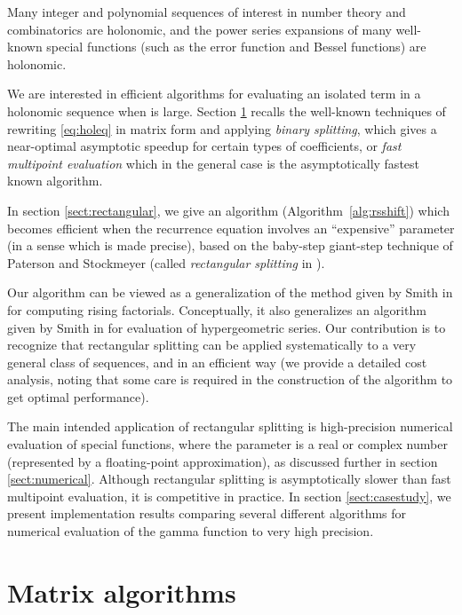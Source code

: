 \documentclass{sig-alternate}
\begin{document}
Many integer and polynomial sequences of interest in number theory and
combinatorics are holonomic, and the power series expansions of many well-known
special functions (such as the error function and Bessel functions)
are holonomic.

We are interested in efficient algorithms for evaluating an isolated term
 in a holonomic sequence when  is large.
Section \ref{sect:matrix} recalls the well-known
techniques of rewriting \eqref{eq:holeq} in matrix form and applying
\emph{binary splitting}, which gives a near-optimal asymptotic speedup
for certain types of coefficients,
or \emph{fast multipoint evaluation} which
in the general case is the asymptotically fastest known algorithm.

In section \ref{sect:rectangular}, we give an algorithm
(Algorithm~\ref{alg:rsshift}) which becomes
efficient when the recurrence equation involves an ``expensive''
parameter (in a sense which is made precise),
based on the baby-step giant-step technique
of Paterson and Stockmeyer \cite{PatersonStockmeyer1973}
(called \emph{rectangular splitting} in \cite{mca}).

Our algorithm can be viewed as a generalization of the method given by Smith in
\cite{Smith2001} for computing rising factorials. Conceptually, it also
generalizes an algorithm given by Smith in \cite{Smith1989} for evaluation
of hypergeometric series. Our contribution is to
recognize that rectangular splitting can be applied
systematically to a very general class of sequences,
and in an efficient way (we provide a detailed cost analysis,
noting that some care is required in the construction
of the algorithm to get optimal performance).

The main intended application of rectangular splitting is
high-precision numerical evaluation
of special functions, where the parameter is a real or complex number
(represented by a floating-point approximation),
as discussed further in section \ref{sect:numerical}.
Although rectangular splitting is asymptotically slower than
fast multipoint evaluation, it is competitive in practice.
In section \ref{sect:casestudy}, we present implementation
results comparing several different algorithms for
numerical evaluation of the gamma function
to very high precision.

\section{Matrix algorithms} \label{sect:matrix}
\end{document}
